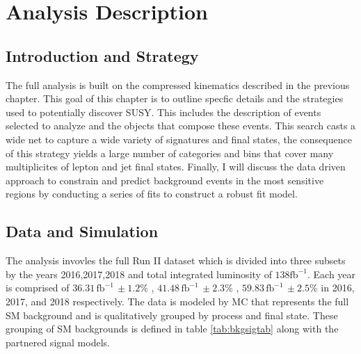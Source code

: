 
\setcounter{secnumdepth}{3}
\setcounter{tocdepth}{3}
\setlength{\parskip}{\smallskipamount}
\setlength{\parindent}{0pt}


\makeatletter


\providecommand{\tabularnewline}{\\}


\makeatother

%

\chapter{Analysis Description }

\section{Introduction and Strategy}
The full analysis is built on the compressed kinematics described in the previous chapter. This goal of this chapter is to outline specfic details and the strategies used to potentially discover SUSY. This includes the description of events selected to analyze and the objects that compose these events. This search casts a wide net to capture a wide variety of signatures and final states, the consequence of this strategy yields a large number of categories and bins that cover many multiplicites of lepton and jet final states. Finally, I will discuss the data driven approach to constrain and predict background events in the most sensitive regions by conducting a series of fits to construct a robust fit model.


\section{ Data and Simulation}
The analysis invovles the full Run II dataset which is divided into three subsets by the years 2016,2017,2018 and total integrated luminosity of $138 \text{fb}^{-1}$. Each year is comprised of $36.31 \, \text{fb}^{-1} \, \pm 1.2\%$ \cite{CMS:2021xjt}, $41.48 \, \text{fb}^{-1} \, \pm 2.3\%$ \cite{CMS:2018elu}, $59.83 \, \text{fb}^{-1} \, \pm2.5\%$ \cite{CMS:2019jhq} in 2016, 2017, and 2018 respectively. The data is modeled by MC that represents the full SM background and is qualitatively grouped by process and final state. These grouping of SM backgrounds is defined in table \ref{tab:bkgsigtab} along with the partnered signal models.

